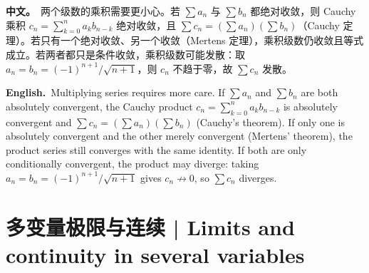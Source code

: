 \documentclass[UTF8,11pt,a4paper]{ctexart}
\newcommand{\BOTH}[2]{\par\noindent\textbf{中文。}\ #1\par\noindent\textbf{English.}\ #2\par}
\begin{document}
\BOTH{两个级数的乘积需要更小心。若 $\sum a_n$ 与 $\sum b_n$ 都绝对收敛，则 Cauchy 乘积 $c_n=\sum_{k=0}^{n}a_kb_{n-k}$ 绝对收敛，且 $\sum c_n=(\sum a_n)(\sum b_n)$（Cauchy 定理）。若只有一个绝对收敛、另一个收敛（Mertens 定理），乘积级数仍收敛且等式成立。若两者都只是条件收敛，乘积级数可能发散：取 $a_n=b_n=(-1)^{n+1}/\sqrt{n+1}$，则 $c_n$ 不趋于零，故 $\sum c_n$ 发散。}{Multiplying series requires more care. If $\sum a_n$ and $\sum b_n$ are both absolutely convergent, the Cauchy product $c_n=\sum_{k=0}^{n}a_kb_{n-k}$ is absolutely convergent and $\sum c_n=(\sum a_n)(\sum b_n)$ (Cauchy's theorem). If only one is absolutely convergent and the other merely convergent (Mertens' theorem), the product series still converges with the same identity. If both are only conditionally convergent, the product may diverge: taking $a_n=b_n=(-1)^{n+1}/\sqrt{n+1}$ gives $c_n\not\to0$, so $\sum c_n$ diverges.}

\setcounter{section}{10}
\section{多变量极限与连续 | Limits and continuity in several variables}
\end{document}
